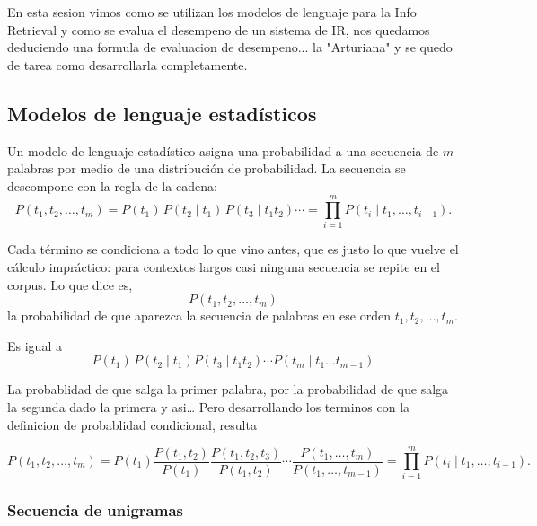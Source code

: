 \documentclass[11pt,letterpaper]{article}
\begin{document}
\newpage



\begin{quick_sum}
    En esta sesion vimos como se utilizan los modelos de lenguaje para la
    Info Retrieval y como se evalua el desempeno de un sistema de IR, nos quedamos
    deduciendo una formula de evaluacion de desempeno... la "Arturiana" y se
    quedo de tarea como desarrollarla completamente.
\end{quick_sum}

\subsection*{Modelos de lenguaje estadísticos}

Un modelo de lenguaje estadístico asigna una probabilidad a una
secuencia de $m$ palabras por medio de una distribución de
probabilidad. La secuencia se descompone con la regla de la cadena:
\[
    P(t_1, t_2, \ldots, t_m) = P(t_1)\, P(t_2 \mid t_1)\,
    P(t_3 \mid t_1 t_2) \cdots
    = \prod_{i=1}^{m} P(t_i \mid t_1, \ldots, t_{i-1}) .
\]

Cada término se condiciona a todo lo que vino antes, que es justo lo
que vuelve el cálculo impráctico: para contextos largos casi ninguna
secuencia se repite en el corpus.
Lo que dice es, \[ P(t_1, t_2, \ldots, t_m)\] la probabilidad de que aparezca la secuencia de palabras en ese orden $t_1, t_2, \ldots, t_m$.

Es igual a \[P(t_1)\, P(t_2 \mid t_1)P(t_3 \mid t_1 t_2) \cdots P(t_m \mid t_1 \ldots t_{m-1})\]

La probablidad de que salga la primer palabra, por la probabilidad de que salga la segunda dado la primera y asi\dots
Pero desarrollando los terminos con la definicion de probablidad condicional, resulta

\[
    P(t_1, t_2, \ldots, t_m) = P(t_1) \frac{P(t_1, t_2)}{P(t_1)} \frac{P(t_1, t_2, t_3)}{P(t_1, t_2)} \cdots \frac{P(t_1, \ldots, t_m)}{P(t_1, \ldots, t_{m-1})} = \prod_{i=1}^{m} P(t_i \mid t_1, \ldots, t_{i-1}) .
\]
\subsubsection*{Secuencia de unigramas}
\end{document}
